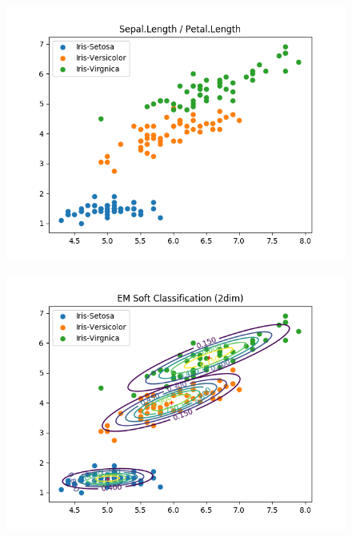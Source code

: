 \documentclass[a4paper]{article}
\begin{document}
\begin{enumerate}
\begin{figure}[htp]
\centering
\begin{minipage}{0.4\textwidth}
  \includegraphics[scale=0.5]{plots/basic_scenario1_cmpnt3.png}
  \label{fig:16}
\end{minipage}
\hfill
\begin{minipage}{0.4\textwidth}
  \includegraphics[scale=0.5]{plots/soft_classification_scenario1_cmpnt3.png}
  \label{fig:17}
\end{minipage}
\end{figure} 


\end{enumerate}
\end{document}
